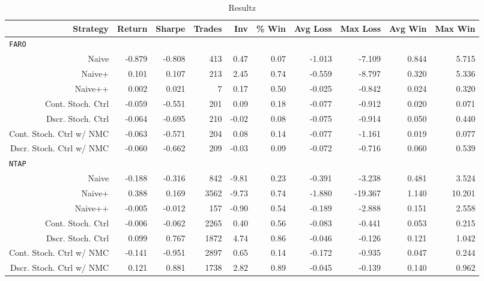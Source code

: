 \begin{sidewaystable}
\centering
{}
\begin{tabular}{@{} *{10}{r} @{}}
\toprule
Strategy & Return & Sharpe & Trades & Inv & \% Win & Avg Loss & Max Loss & Avg Win & Max Win \\
\midrule
\multicolumn{10}{l}{\texttt{FARO}} \\
Naive & -0.879 & -0.808 & 413 & 0.47 & 0.07 & -1.013 & -7.109 & 0.844 & 5.715 \\ 
Naive+ & 0.101 & 0.107 & 213 & 2.45 & 0.74 & -0.559 & -8.797 & 0.320 & 5.336 \\ 
Naive++ & 0.002 & 0.021 & 7 & 0.17 & 0.50 & -0.025 & -0.842 & 0.024 & 0.320 \\ 
Cont. Stoch. Ctrl & -0.059 & -0.551 & 201 & 0.09 & 0.18 & -0.077 & -0.912 & 0.020 & 0.071 \\ 
Dscr. Stoch. Ctrl & -0.064 & -0.695 & 210 & -0.02 & 0.08 & -0.075 & -0.914 & 0.050 & 0.440 \\ 
Cont. Stoch. Ctrl w/ NMC & -0.063 & -0.571 & 204 & 0.08 & 0.14 & -0.077 & -1.161 & 0.019 & 0.077 \\ 
Dscr. Stoch. Ctrl w/ NMC & -0.060 & -0.662 & 209 & -0.03 & 0.09 & -0.072 & -0.716 & 0.060 & 0.539 \\[2ex]
\multicolumn{10}{l}{\texttt{NTAP}} \\
Naive & -0.188 & -0.316 & 842 & -9.81 & 0.23 & -0.391 & -3.238 & 0.481 & 3.524 \\ 
Naive+ & 0.388 & 0.169 & 3562 & -9.73 & 0.74 & -1.880 & -19.367 & 1.140 & 10.201 \\ 
Naive++ & -0.005 & -0.012 & 157 & -0.90 & 0.54 & -0.189 & -2.888 & 0.151 & 2.558 \\ 
Cont. Stoch. Ctrl & -0.006 & -0.062 & 2265 & 0.40 & 0.56 & -0.083 & -0.441 & 0.053 & 0.215 \\ 
Dscr. Stoch. Ctrl & 0.099 & 0.767 & 1872 & 4.74 & 0.86 & -0.046 & -0.126 & 0.121 & 1.042 \\ 
Cont. Stoch. Ctrl w/ NMC & -0.141 & -0.951 & 2897 & 0.65 & 0.14 & -0.172 & -0.935 & 0.047 & 0.244 \\ 
Dscr. Stoch. Ctrl w/ NMC & 0.121 & 0.881 & 1738 & 2.82 & 0.89 & -0.045 & -0.139 & 0.140 & 0.962 \\ 
\bottomrule
\end{tabular}
\caption{Resultz}
\label{tbl:insamplestochFARONTAP}
\end{sidewaystable}

